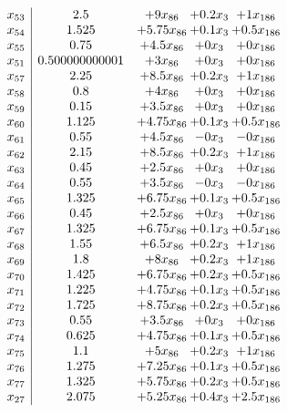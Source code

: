 \documentclass[11pt]{article}
\begin{document}
\[\begin{array}{c| c c@{\hskip 2pt} c@{\hskip 2pt} c@{\hskip 2pt} }
 x_{53}   &  2.5 & + 9 x_{86} & + 0.2 x_{3} & + 1 x_{186}\\
 x_{54}   &  1.525 & + 5.75 x_{86} & + 0.1 x_{3} & + 0.5 x_{186}\\
 x_{55}   &  0.75 & + 4.5 x_{86} & + 0 x_{3} & + 0 x_{186}\\
 x_{51}   &  0.500000000001 & + 3 x_{86} & + 0 x_{3} & + 0 x_{186}\\
 x_{57}   &  2.25 & + 8.5 x_{86} & + 0.2 x_{3} & + 1 x_{186}\\
 x_{58}   &  0.8 & + 4 x_{86} & + 0 x_{3} & + 0 x_{186}\\
 x_{59}   &  0.15 & + 3.5 x_{86} & + 0 x_{3} & + 0 x_{186}\\
 x_{60}   &  1.125 & + 4.75 x_{86} & + 0.1 x_{3} & + 0.5 x_{186}\\
 x_{61}   &  0.55 & + 4.5 x_{86} & -0 x_{3} & -0 x_{186}\\
 x_{62}   &  2.15 & + 8.5 x_{86} & + 0.2 x_{3} & + 1 x_{186}\\
 x_{63}   &  0.45 & + 2.5 x_{86} & + 0 x_{3} & + 0 x_{186}\\
 x_{64}   &  0.55 & + 3.5 x_{86} & -0 x_{3} & -0 x_{186}\\
 x_{65}   &  1.325 & + 6.75 x_{86} & + 0.1 x_{3} & + 0.5 x_{186}\\
 x_{66}   &  0.45 & + 2.5 x_{86} & + 0 x_{3} & + 0 x_{186}\\
 x_{67}   &  1.325 & + 6.75 x_{86} & + 0.1 x_{3} & + 0.5 x_{186}\\
 x_{68}   &  1.55 & + 6.5 x_{86} & + 0.2 x_{3} & + 1 x_{186}\\
 x_{69}   &  1.8 & + 8 x_{86} & + 0.2 x_{3} & + 1 x_{186}\\
 x_{70}   &  1.425 & + 6.75 x_{86} & + 0.2 x_{3} & + 0.5 x_{186}\\
 x_{71}   &  1.225 & + 4.75 x_{86} & + 0.1 x_{3} & + 0.5 x_{186}\\
 x_{72}   &  1.725 & + 8.75 x_{86} & + 0.2 x_{3} & + 0.5 x_{186}\\
 x_{73}   &  0.55 & + 3.5 x_{86} & + 0 x_{3} & + 0 x_{186}\\
 x_{74}   &  0.625 & + 4.75 x_{86} & + 0.1 x_{3} & + 0.5 x_{186}\\
 x_{75}   &  1.1 & + 5 x_{86} & + 0.2 x_{3} & + 1 x_{186}\\
 x_{76}   &  1.275 & + 7.25 x_{86} & + 0.1 x_{3} & + 0.5 x_{186}\\
 x_{77}   &  1.325 & + 5.75 x_{86} & + 0.2 x_{3} & + 0.5 x_{186}\\
 x_{27}   &  2.075 & + 5.25 x_{86} & + 0.4 x_{3} & + 2.5 x_{186}\\

\end{array}\]
\end{document}
